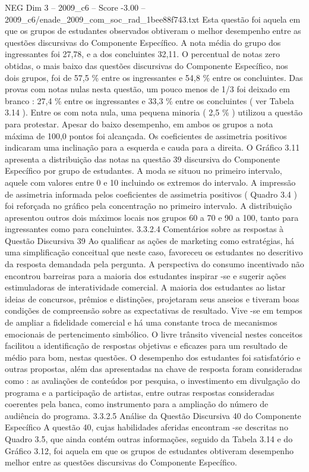 \begin{textsample}{NEG Dim 3 – 2009\_c6 – Score -3.00 – 2009\_c6/enade\_2009\_com\_soc\_rad\_1bee88f743.txt}
Esta questão foi aquela em que os grupos de estudantes observados obtiveram o melhor desempenho entre as questões discursivas do Componente Específico.
A nota média do grupo dos ingressantes foi 27,78, e a dos concluintes 32,11.
O percentual de notas zero obtidas, o mais baixo das questões discursivas do Componente Específico, nos dois grupos, foi de 57,5 \% entre os ingressantes e 54,8 \% entre os concluintes.
Das provas com notas nulas nesta questão, um pouco menos de 1/3 foi deixado em branco : 27,4 \% entre os ingressantes e 33,3 \% entre os concluintes ( ver Tabela 3.14 ).
Entre os com nota nula, uma pequena minoria ( 2,5 \% ) utilizou a questão para protestar.
Apesar do baixo desempenho, em ambos os grupos a nota máxima de 100,0 pontos foi alcançada.
Os coeficientes de assimetria positivos indicaram uma inclinação para a esquerda e cauda para a direita.
O Gráfico 3.11 apresenta a distribuição das notas na questão 39 discursiva do Componente Específico por grupo de estudantes.
A moda se situou no primeiro intervalo, aquele com valores entre 0 e 10 incluindo os extremos do intervalo.
A impressão de assimetria informada pelos coeficientes de assimetria positivos ( Quadro 3.4 ) foi reforçada no gráfico pela concentração no primeiro intervalo.
A distribuição apresentou outros dois máximos locais nos grupos 60 a 70 e 90 a 100, tanto para ingressantes como para concluintes. 3.3.2.4 Comentários sobre as respostas à Questão Discursiva 39 Ao qualificar as ações de marketing como estratégias, há uma simplificação conceitual que neste caso, favoreceu os estudantes no descritivo da resposta demandada pela pergunta.
A perspectiva do consumo incentivado não encontrou barreiras para a maioria dos estudantes inspirar -se e sugerir ações estimuladoras de interatividade comercial.
A maioria dos estudantes ao listar ideias de concursos, prêmios e distinções, projetaram seus anseios e tiveram boas condições de compreensão sobre as expectativas de resultado.
Vive -se em tempos de ampliar a fidelidade comercial e há uma constante troca de mecanismos emocionais de pertencimento simbólico.
O livre trânsito vivencial nestes conceitos facilitou a identificação de respostas objetivas e eficazes para um resultado de médio para bom, nestas questões.
O desempenho dos estudantes foi satisfatório e outras propostas, além das apresentadas na chave de resposta foram consideradas como : as avaliações de conteúdos por pesquisa, o investimento em divulgação do programa e a participação de artistas, entre outras respostas consideradas coerentes pela banca, como instrumento para a ampliação do número de audiência do programa. 3.3.2.5 Análise da Questão Discursiva 40 do Componente Específico A questão 40, cujas habilidades aferidas encontram -se descritas no Quadro 3.5, que ainda contém outras informações, seguido da Tabela 3.14 e do Gráfico 3.12, foi aquela em que os grupos de estudantes obtiveram desempenho melhor entre as questões discursivas do Componente Específico.

\end{textsample}

